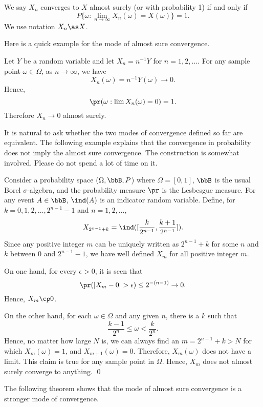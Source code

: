 \begin{defi}
We say $X_n$ converges to $X$ almost surely (or with probability 1)
if and only if
\[
P\{ \omega : \lim_{n \to \infty} X_n(\omega) = X(\omega) \} =1.
\]
We use notation $X_n \as X$.
\end{defi}

Here is a quick example for the mode of almost sure convergence.

\begin{example}
Let $Y$ be a random variable and let $X_n = n^{-1} Y$
for $n=1, 2, \ldots$.
For any sample point $\omega \in \Omega$, as $n \to \infty$,
we have
\[
X_n(\omega) = n^{-1} Y(\omega) \to 0.
\]
Hence,
\[
\pr( \omega: \lim X_n(\omega) = 0 ) = 1.
\]
Therefore $X_n \to 0$ almost surely.
\end{example}

It is natural to ask whether the two modes of convergence defined so
far are equivalent. The following example explains that the convergence
in probability does not imply the almost sure convergence.
The construction is somewhat involved.  Please do not spend
a lot of time on it.

\begin{example}
Consider a probability space ($\Omega, \bbB, P$) where
$\Omega = [0,1]$, $\bbB$ is the usual Borel $\sigma$-algebra, 
and the probability measure $\pr$ is the Lesbesgue measure. 
For any event $A \in \bbB$, $\ind(A)$ is an indicator random variable.
Define, for $k =0, 1, 2, \ldots, 2^{n-1}-1$ and $n=1, 2, \ldots$,
\[
X_{2^{n-1}+k} = \ind ([ \frac{k}{2^{n-1}}, \frac{k+1}{2^{n-1}}]).
\]
Since any positive integer $m$ can be uniquely written as ${2^{n-1}+k}$
for some $n$ and $k$ between $0$ and $2^{n-1}-1$, 
we have well defined $X_m$ for all positive integer $m$.

On one hand, for every $\epsilon > 0$, it is seen that
\[ 
\pr ( |X_m - 0| > \epsilon ) \leq {2^{-(n-1)}} \to 0.
\]
Hence, $X_m \cp 0$. 

On the other hand,  for each $\omega \in \Omega$
and any given $n$, there is a $k$ such that
\[
 \frac{k-1}{2^{n}}\leq \omega <  \frac{k}{2^{n}}.
\]
Hence, no matter how large $N$ is, we can always
find an $m = 2^{n-1}+k  > N$ for which
$X_m(\omega) = 1$, and $X_{m+1}(\omega) = 0$.
Therefore, $X_m(\omega)$ does not have a limit.
This claim is true for any sample point in $\Omega$.
Hence, $X_m$ does not almost surely converge to anything.
\qed
\end{example}

The following theorem shows that the mode of almost sure
convergence is a stronger mode of convergence.

